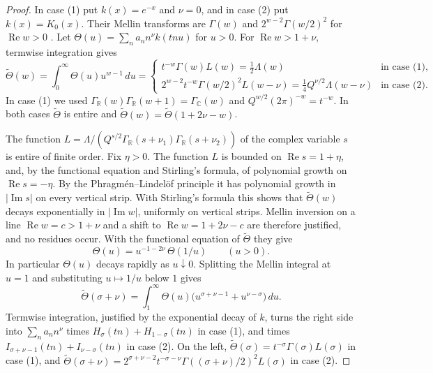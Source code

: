 \documentclass[11pt]{amsart}
\numberwithin{equation}{section}
\theoremstyle{definition}
\theoremstyle{remark}
\newcommand{\R}{\mathbb R}
\newcommand{\C}{\mathbb C}
\begin{document}
\begin{proof}
In case (1) put $k(x)=e^{-x}$ and $\nu=0$, and in case (2) put
$k(x)=K_0(x)$. Their Mellin transforms are $\Gamma(w)$ and
$2^{w-2}\Gamma(w/2)^2$ for $\operatorname{Re}w>0$
\cite[10.43.19]{DLMF}. Let $\Theta(u)=\sum_na_nn^\nu k(tnu)$ for $u>0$. For
$\operatorname{Re}w>1+\nu$, termwise integration gives
\[
 \widetilde\Theta(w)=\int_0^\infty\Theta(u)u^{w-1}\,du=
 \begin{cases}
 t^{-w}\Gamma(w)L(w)=\tfrac12\Lambda(w)&\text{in case (1)},\\
 2^{w-2}t^{-w}\Gamma(w/2)^2L(w-\nu)=\tfrac14Q^{\nu/2}\Lambda(w-\nu)
 &\text{in case (2)}.
 \end{cases}
\]
In case (1) we used $\Gamma_\R(w)\Gamma_\R(w+1)=\Gamma_\C(w)$ and
$Q^{w/2}(2\pi)^{-w}=t^{-w}$. In both cases $\widetilde\Theta$ is entire and
$\widetilde\Theta(w)=\widetilde\Theta(1+2\nu-w)$.

The function $L=\Lambda/(Q^{s/2}\Gamma_\R(s+\nu_1)\Gamma_\R(s+\nu_2))$ of the
complex variable $s$ is entire of finite order. Fix $\eta>0$. The function
$L$ is bounded on $\operatorname{Re}s=1+\eta$, and, by the functional
equation and Stirling's formula, of polynomial growth on
$\operatorname{Re}s=-\eta$. By the Phragm\'en--Lindel\"of principle it has
polynomial growth in $|\operatorname{Im}s|$ on every vertical strip. With
Stirling's formula this shows that $\widetilde\Theta(w)$ decays exponentially in
$|\operatorname{Im}w|$, uniformly on vertical strips. Mellin inversion on a
line $\operatorname{Re}w=c>1+\nu$ and a shift to
$\operatorname{Re}w=1+2\nu-c$ are therefore justified, and no residues
occur. With the functional equation of $\widetilde\Theta$ they give
\[
 \Theta(u)=u^{-1-2\nu}\,\Theta(1/u)\qquad(u>0).
\]
In particular $\Theta(u)$ decays rapidly as $u\downarrow0$. Splitting the
Mellin integral at $u=1$ and substituting $u\mapsto1/u$ below $1$ gives
\[
 \widetilde\Theta(\sigma+\nu)=\int_1^\infty\Theta(u)
 \bigl(u^{\sigma+\nu-1}+u^{\nu-\sigma}\bigr)\,du.
\]
Termwise integration, justified by the exponential decay of $k$, turns the
right side into $\sum_na_nn^\nu$ times $H_\sigma(tn)+H_{1-\sigma}(tn)$ in case
(1), and times $I_{\sigma+\nu-1}(tn)+I_{\nu-\sigma}(tn)$ in case (2). On the
left, $\widetilde\Theta(\sigma)=t^{-\sigma}\Gamma(\sigma)L(\sigma)$ in case (1), and
$\widetilde\Theta(\sigma+\nu)=2^{\sigma+\nu-2}t^{-\sigma-\nu}
\Gamma((\sigma+\nu)/2)^2L(\sigma)$ in case (2).
\end{proof}
\end{document}
